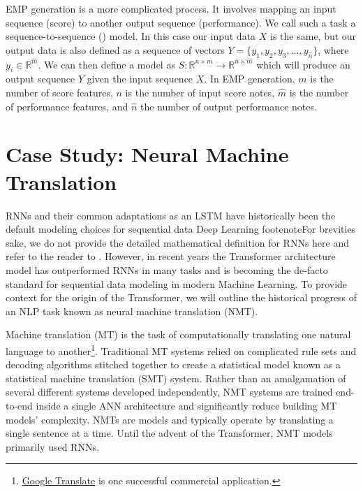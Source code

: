 EMP generation is a more complicated process. It involves mapping an input sequence (score) to another output sequence (performance). We call such a task a sequence-to-sequence (\seq{}) model. In this case our input data $X$ is the same, but our output data is also defined as a sequence of vectors $Y = \{y_1, y_2, y_3, ..., y_{\hat{n}}\}$, where $y_i \in \mathbb{R}^{\hat{m}}$. We can then define a \seq{} model as $S: \mathbb{R}^{n \times m} \rightarrow \mathbb{R}^{\hat{n} \times \hat{m}}$ which will produce an output sequence $Y$ given the input sequence $X$. In EMP generation, $m$ is the number of score features, $n$ is the number of input score notes, $\hat{m}$ is the number of performance features, and $\hat{n}$ the number of output performance notes. 

\section{Case Study: Neural Machine Translation}
RNNs and their common adaptations as an LSTM have historically been the default modeling choices for sequential data Deep Learning footenote{For brevities sake, we do not provide the detailed mathematical definition for RNNs here and refer to the reader to \cite{goodfellow2016deep}}. However, in recent years the Transformer\cite{vaswani2017attention} architecture model has outperformed RNNs in many tasks and is becoming the de-facto standard for sequential data modeling in modern Machine Learning. To provide context for the origin of the Transformer, we will outline the historical progress of an NLP task known as neural machine translation (NMT). 

Machine translation (MT) is the task of computationally translating one natural language to another\footnote{\href{https://translate.google.com/}{Google Translate} is one successful commercial application.}. Traditional MT systems relied on complicated rule sets and decoding algorithms stitched together to create a statistical model known as a statistical machine translation (SMT) system. Rather than an amalgamation of several different systems developed independently, NMT systems are trained end-to-end inside a single ANN architecture and significantly reduce building MT models' complexity. NMTs are \seq{} models and typically operate by translating a single sentence at a time. Until the advent of the Transformer, NMT models primarily used RNNs. 

